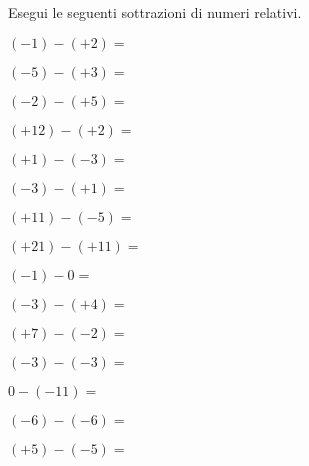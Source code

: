 \begin{esercizio}
Esegui le seguenti sottrazioni di numeri relativi.
\label{ese:2.9}
\begin{multicols}{3}
\begin{enumeratea}
 \item \((-1)-(+2) =~\)
 \item \((-5)-(+3) =~\)
 \item \((-2)-(+5) =~\)
 \item \((+12)-(+2) =\)
 \item \((+1)-(-3) =\)
 \item \((-3)-(+1) =\)
 \item \((+11)-(-5) =\)
 \item \((+21)-(+11) =\)
 \item \((-1)-0 =\)
 \item \((-3)-(+4) =\)
 \item \((+7)-(-2) =\)
 \item \((-3)-(-3) =\)
 \item \(0-(-11) =\)
 \item \((-6)-(-6) =\)
 \item \((+5)-(-5) =\)
\end{enumeratea}
\end{multicols}
\end{esercizio}

